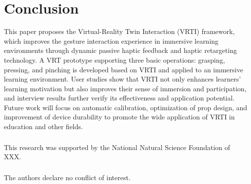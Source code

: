 \documentclass[runningheads]{llncs}
\begin{document}
\section{Conclusion}
This paper proposes the Virtual-Reality Twin Interaction (VRTI) framework, which improves the gesture interaction experience in immersive learning environments through dynamic passive haptic feedback and haptic retargeting technology. A VRT prototype supporting three basic operations: grasping, pressing, and pinching is developed based on VRTI and applied to an immersive learning environment. User studies show that VRTI not only enhances learners' learning motivation but also improves their sense of immersion and participation, and interview results further verify its effectiveness and application potential. Future work will focus on automatic calibration, optimization of prop design, and improvement of device durability to promote the wide application of VRTI in education and other fields.

\begin{credits}
\subsubsection{\ackname}
This research was supported by the National Natural Science Foundation of XXX.

\subsubsection{\discintname}
The authors declare no conflict of interest.
\end{credits}


\end{document}

